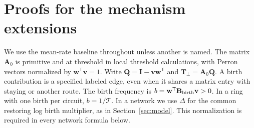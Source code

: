 \section{Proofs for the mechanism extensions}\label{app:mech}
We use the mean-rate baseline throughout unless another is named. The matrix \(\mathbf A_0\) is primitive and at threshold in local threshold calculations, with Perron vectors normalized by \(\mathbf w^{\mathsf T}\mathbf v=1\). Write \(\mathbf Q=\mathbf I-\mathbf v\mathbf w^{\mathsf T}\) and \(\mathbf T_\perp=\mathbf A_0\mathbf Q\). A birth contribution is a specified labeled edge, even when it shares a matrix entry with staying or another route. The birth frequency is \(b=\mathbf w^{\mathsf T}\mathbf B_{\rm birth}\mathbf v>0\). In a ring with one birth per circuit, \(b=1/\mathcal T\). In a network we use \(\Delta\) for the common restoring log birth multiplier, as in Section~\ref{sec:model}. This normalization is required in every network formula below.

